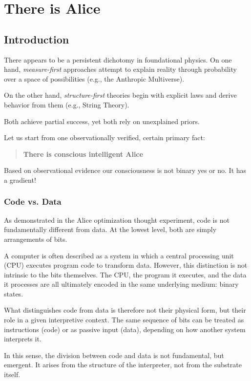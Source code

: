 \chapter{There is Alice}

\section{Introduction}

There appears to be a persistent dichotomy in foundational physics.
On one hand, \textit{measure-first} approaches attempt to explain reality through probability over a space of possibilities (e.g., the Anthropic Multiverse).

On the other hand, \textit{structure-first} theories begin with explicit laws and derive behavior from them (e.g., String Theory).

Both achieve partial success, yet both rely on unexplained priors.

Let us start from one observationally verified, certain primary fact:

\begin{quote}
\textbf{There is conscious intelligent Alice}
\end{quote}

Based on observational evidence our consciousness is not binary yes or no. It has a gradient! 


\subsection*{Code vs. Data}

As demonstrated in the Alice optimization thought experiment, code is not fundamentally different from data.
At the lowest level, both are simply arrangements of bits.

A computer is often described as a system in which a central processing unit (CPU) executes program code to transform data. However, this distinction is not intrinsic to the bits themselves. The CPU, the program it executes, and the data it processes are all ultimately encoded in the same underlying medium: binary states.

What distinguishes code from data is therefore not their physical form, but their role in a given interpretive context. The same sequence of bits can be treated as instructions (code) or as passive input (data), depending on how another system interprets it.

In this sense, the division between code and data is not fundamental, but emergent. It arises from the structure of the interpreter, not from the substrate itself.


